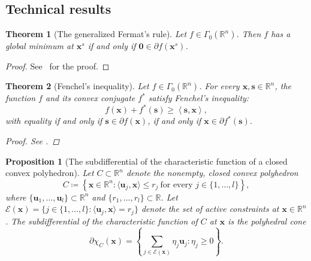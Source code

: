\documentclass[11pt]{article}
\newtheorem{prop}{Proposition}[section]
\numberwithin{prop}{section}
\numberwithin{lem}{section}
\numberwithin{rem}{section}
\numberwithin{cor}{section}
\newtheorem{thm}{Theorem}[section]
\numberwithin{thm}{section}
\newtheorem{defn}{Definition}
\numberwithin{defn}{section}
\numberwithin{fact}{section}
\theoremstyle{plain}
\def\bu {\boldsymbol{u}}
\def\bs {\boldsymbol{s}}
\def\bx {\boldsymbol{x}}
\def\R {\mathbb{R}}
\def\Rn {\R^n}
\def\gmRn {\Gamma_0(\Rn)}   %
\def\bxsol {\bx^{s}}
\begin{document}
%
%
\subsection*{Technical results}
\begin{thm}[The generalized Fermat's rule]\label{thm:fermat}
Let $f \in \gmRn$. Then $f$ has a global minimum at $\bxsol$ if and only if $\boldsymbol{0} \in \partial f(\bxsol)$.    
\end{thm}
\begin{proof}
    See~\cite[Theorem 10.1, page 422]{rockafellar2009variational} for the proof.
\end{proof}
%
\begin{thm}[Fenchel's inequality]
Let $f \in \gmRn$. For every $\bx, \bs \in \Rn$, the function $f$ and its convex conjugate $f^{*}$ satisfy Fenchel's inequality:
\begin{equation} \label{eq:fenchel_ineq}
f(\bx)+f^{*}(\bs) \geqslant \left\langle \bs,\bx\right\rangle,
\end{equation}
with equality if and only if $\bs\in\partial f(\bx)$, if and only if $\bx\in\partial f^{*}(\bs)$.
\begin{proof}
See \cite[Corollary 1.4.4, page 48]{hiriart2013convexII}.
\end{proof}
\end{thm}
%
\begin{prop}[The subdifferential of the characteristic function of a closed convex polyhedron]\label{prop:subdiff_ccp} Let $C \subset \Rn$ denote the nonempty, closed convex polyhedron 
\[C \coloneqq \left\{\bx \in \Rn : \langle\bu_{j},\bx\rangle \leqslant r_{j} \ \text{for every $j \in \{1,\dots,l\}$}  \right\},
\]
where $\{\bu_{1},\dots,\bu_{l}\} \subset \Rn$ and $\{r_{1},\dots,r_{l}\}\subset \R$. Let $\mathcal{E}(\bx) = \{j\in\{1,\dots,l\} : \langle\bu_{j},\bx\rangle = r_{j}\}$ denote the set of active constraints at $\bx \in \Rn$. The subdifferential of the characteristic function of $C$ at $\bx$ is the polyhedral cone
\[
\partial\chi_{C}(\bx) = \left\{\sum_{j \in \mathcal{E}(\bx)}\eta_{j}\bu_{j} : \eta_{j} \geqslant 0\right\}.
\]
\end{prop}
\end{document}
